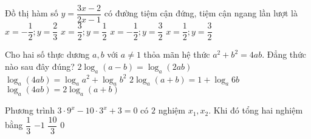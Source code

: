 \begin{ex}%
Đồ thị hàm số $y=\dfrac{3x-2}{2x-1}$ có đường tiệm cận đứng, tiệm cận ngang lần lượt là
\choice
{$x=-\dfrac{1}{2}; y = \dfrac{2}{3}$}
{$x=\dfrac{3}{2}; y = \dfrac{1}{2}$}
{$x=-\dfrac{1}{2}; y = \dfrac{3}{2}$}
{\True $x=\dfrac{1}{2}; y = \dfrac{3}{2}$}
\end{ex}

\begin{ex}%
Cho hai số thực dương $a,b$ với $a\ne 1$ thỏa mãn hệ thức $a^2+b^2=4ab$. Đẳng thức nào sau đây đúng?
\choice
{$2\log_a (a-b) = \log_a (2ab)$}
{$\log_a (4ab) = \log_a a^2 + \log_a b^2$}
{\True $2\log_a (a+b) = 1 + \log_a 6b$}
{$\log_a (4ab) = 2\log_a (a+b)$}
\end{ex}

\begin{ex}%
Phương trình $3 \cdot 9^x - 10 \cdot 3^x +3 =0$ có $2$ nghiệm $x_1, x_2$. Khi đó tổng hai nghiệm bằng
\choice
{$\dfrac{1}{3}$}
{$-1$}
{$\dfrac{10}{3}$}
{\True $0$}
\end{ex}

